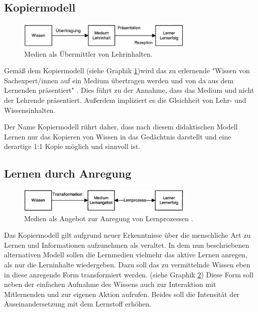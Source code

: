 \subsection{Kopiermodell}
\label{sub:Kopiermodell}
\begin{figure}[h]
	\centering
	\includegraphics[width=0.75\textwidth]{Abbildungen/Kerres2001_Kopiermodell.PNG}
	\caption{Medien als Übermittler von Lehrinhalten. \cite[S. 146]{Kerres.2001}}
	\label{fig:Kerres2001_Kopiermodell}
\end{figure}
Gemäß dem Kopiermodell (siehe Graphik \ref{fig:Kerres2001_Kopiermodell})wird das zu erlernende "Wissen von Sachexpert/innen auf ein Medium übertragen werden und von da aus dem Lernenden präsentiert" \cite[S. 146]{Kerres.2001}. Dies führt zu der Annahme, dass das Medium und nicht der Lehrende präsentiert. Außerdem impliziert es die Gleichheit von Lehr- und Wissensinhalten.

Der Name Kopiermodell rührt daher, dass nach diesem didaktischen Modell Lernen nur das Kopieren von Wissen in das Gedächtnis darstellt und eine derartige 1:1 Kopie möglich und sinnvoll ist. \cite[S. 145 - 146]{Kerres.2001}

\subsection{Lernen durch Anregung}
\label{sub:LernenDurchAnregung}
\begin{figure}[h]
	\centering
	\includegraphics[width=0.75\textwidth]{Abbildungen/Kerres2001_LernenDurchAnregung.PNG}
	\caption{Medien als Angebot zur Anregung von Lernprozessen . \cite[S. 147]{Kerres.2001}}
	\label{fig:Kerres2001_LernenDurchAnregung}
\end{figure}
Das Kopiermodell gilt aufgrund neuer Erkenntnisse über die menschliche Art zu Lernen und Informationen aufzunehmen als veraltet.
In dem nun beschriebenen alternativen Modell sollen die Lernmedien vielmehr das aktive Lernen anregen, als nur die Lerninhalte wiedergeben. 
Dazu soll das zu vermittelnde Wissen eben in diese anregende Form transformiert werden. (siehe Graphik \ref{fig:Kerres2001_LernenDurchAnregung}) Diese Form soll neben der einfachen Aufnahme des Wissens auch zur Interaktion mit Mitlernenden und zur eigenen Aktion aufrufen. Beides soll die Intensität der Auseinandersetzung mit dem Lernstoff erhöhen. \cite[S. 147 - 148]{Kerres.2001}